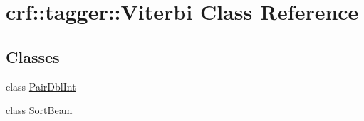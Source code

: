 \hypertarget{classcrf_1_1tagger_1_1Viterbi}{
\section{crf::tagger::Viterbi Class Reference}
\label{classcrf_1_1tagger_1_1Viterbi}
}
\subsection*{Classes}
\begin{DoxyCompactItemize}
\item 
class \hyperlink{classcrf_1_1tagger_1_1Viterbi_1_1PairDblInt}{PairDblInt}
\item 
class \hyperlink{classcrf_1_1tagger_1_1Viterbi_1_1SortBeam}{SortBeam}
\end{DoxyCompactItemize}
